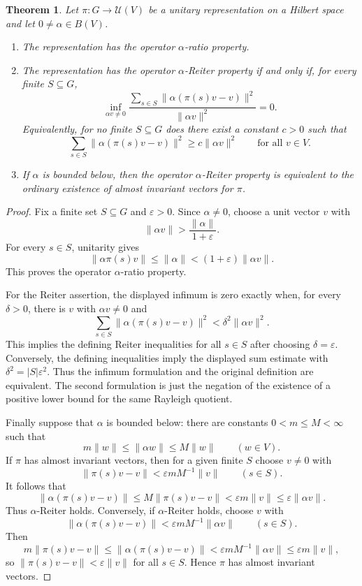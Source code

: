 \documentclass[11pt]{article}
\newtheorem{theorem}{Theorem}
\newcommand{\eps}{\varepsilon}
\begin{document}
\begin{theorem}
\label{thm:main}
Let $\pi:G\to \mathcal U(V)$ be a unitary representation on a Hilbert space
and let $0\neq \alpha\in B(V)$.

\begin{enumerate}
\item The representation has the operator $\alpha$-ratio property.

\item The representation has the operator $\alpha$-Reiter property if and only
if, for every finite $S\subseteq G$,
\[
  \inf_{\alpha v\neq 0}
  \frac{\sum_{s\in S}\|\alpha(\pi(s)v-v)\|^2}{\|\alpha v\|^2}=0.
\]
Equivalently, for no finite $S\subseteq G$ does there exist a constant
$c>0$ such that
\[
  \sum_{s\in S}\|\alpha(\pi(s)v-v)\|^2
  \geq c\|\alpha v\|^2
  \qquad\text{for all }v\in V.
\]
\item If $\alpha$ is bounded below, then the operator $\alpha$-Reiter property
is equivalent to the ordinary existence of almost invariant vectors for
$\pi$.
\end{enumerate}
\end{theorem}

\begin{proof}
Fix a finite set $S\subseteq G$ and $\eps>0$.  Since $\alpha\neq 0$, choose a
unit vector $v$ with
\[
  \|\alpha v\|>\frac{\|\alpha\|}{1+\eps}.
\]
For every $s\in S$, unitarity gives
\[
  \|\alpha\pi(s)v\|\leq \|\alpha\| < (1+\eps)\|\alpha v\|.
\]
This proves the operator $\alpha$-ratio property.

For the Reiter assertion, the displayed infimum is zero exactly when, for
every $\delta>0$, there is $v$ with $\alpha v\neq 0$ and
\[
  \sum_{s\in S}\|\alpha(\pi(s)v-v)\|^2 < \delta^2\|\alpha v\|^2.
\]
This implies the defining Reiter inequalities for all $s\in S$ after choosing
$\delta=\eps$.  Conversely, the defining inequalities imply the displayed
sum estimate with $\delta^2=|S|\eps^2$.  Thus the infimum formulation and the
original definition are equivalent.  The second formulation is just the
negation of the existence of a positive lower bound for the same Rayleigh
quotient.

Finally suppose that $\alpha$ is bounded below: there are constants
$0<m\leq M<\infty$ such that
\[
  m\|w\|\leq \|\alpha w\|\leq M\|w\|\qquad(w\in V).
\]
If $\pi$ has almost invariant vectors, then for a given finite $S$ choose
$v\neq 0$ with
\[
  \|\pi(s)v-v\|<\eps m M^{-1}\|v\|\qquad(s\in S).
\]
It follows that
\[
  \|\alpha(\pi(s)v-v)\|
  \leq M\|\pi(s)v-v\|
  < \eps m\|v\|
  \leq \eps\|\alpha v\|.
\]
Thus $\alpha$-Reiter holds.  Conversely, if $\alpha$-Reiter holds, choose
$v$ with
\[
  \|\alpha(\pi(s)v-v)\|<\eps m M^{-1}\|\alpha v\|
  \qquad(s\in S).
\]
Then
\[
  m\|\pi(s)v-v\|\leq \|\alpha(\pi(s)v-v)\|
  < \eps m M^{-1}\|\alpha v\|
  \leq \eps m\|v\|,
\]
so $\|\pi(s)v-v\|<\eps\|v\|$ for all $s\in S$.  Hence $\pi$ has almost
invariant vectors.
\end{proof}
\end{document}
